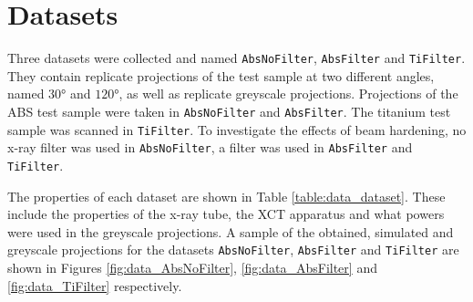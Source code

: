 \section{Datasets}

Three datasets were collected and named \texttt{AbsNoFilter}, \texttt{AbsFilter} and \texttt{TiFilter}. They contain replicate projections of the test sample at two different angles, named $\ang{30}$ and $\ang{120}$, as well as replicate greyscale projections. Projections of the ABS test sample were taken in \texttt{AbsNoFilter} and \texttt{AbsFilter}. The titanium test sample was scanned in \texttt{TiFilter}. To investigate the effects of beam hardening, no x-ray filter was used in \texttt{AbsNoFilter}, a filter was used in \texttt{AbsFilter} and \texttt{TiFilter}.

The properties of each dataset are shown in Table \ref{table:data_dataset}. These include the properties of the x-ray tube, the XCT apparatus and what powers were used in the greyscale projections. A sample of the obtained, simulated and greyscale projections for the datasets \texttt{AbsNoFilter}, \texttt{AbsFilter} and \texttt{TiFilter} are shown in Figures \ref{fig:data_AbsNoFilter}, \ref{fig:data_AbsFilter} and \ref{fig:data_TiFilter} respectively.

